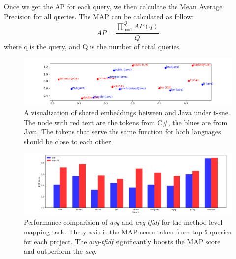 Once we get the AP for each query, we then calculate the Mean Average Precision for all queries. The MAP can be calculated as follow:
\begin{displaymath}
AP = \frac{\prod_\text{p=1}^Q AP(q)}{Q}
\end{displaymath}
where q is the query, and Q is the number of total queries.
\begin{figure}[t!]
	\centering
	\includegraphics[width=1\textwidth]{example_bi2vec_tsne}
	\caption{A visualization of shared embeddings between  and Java under t-sne. The node with red text are the tokens from C\#, the blues are from Java. The tokens that serve the same function for both languages should be close to each other.}
	\label{fig:tsne}
\end{figure}

\begin{figure}[t!]
	\centering
	
	\includegraphics[width=1\textwidth]{avg_vs_tfidf}
	\caption{Performance comparision of \textit{avg} and \textit{avg-tfidf} for the method-level mapping task. The y axis is the MAP score taken from top-5 queries for each project. The \textit{avg-tfidf} significantly boosts the MAP score and outperform the \textit{avg}.}
	\label{fig:avg_vs_tfidf}
\end{figure}



